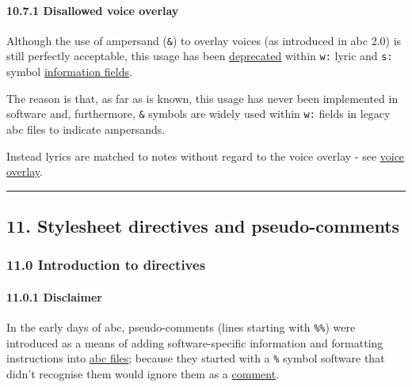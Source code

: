 \documentclass[oneside]{book}
\let\oldparagraph\paragraph
\renewcommand{\paragraph}[1]{\oldparagraph{#1}\mbox{}}
\begin{document}
\hypertarget{disallowed_voice_overlay}{\paragraph{10.7.1 Disallowed
voice overlay}\label{disallowed_voice_overlay}}

Although the use of ampersand (\texttt{\&}) to overlay voices (as
introduced in abc 2.0) is still perfectly acceptable, this usage has
been \protect\hyperlink{outdated_syntax}{deprecated} within \texttt{w:}
lyric and \texttt{s:} symbol
\protect\hyperlink{information_field_definition}{information fields}.

The reason is that, as far as is known, this usage has never been
implemented in software and, furthermore, \texttt{\&} symbols are widely
used within \texttt{w:} fields in legacy abc files to indicate
ampersands.

Instead lyrics are matched to notes without regard to the voice overlay
- see \protect\hyperlink{voice_overlay}{voice overlay}.

\begin{center}\rule{0.5\linewidth}{\linethickness}\end{center}

\hypertarget{stylesheet_directives_and_pseudo-comments}{\subsection{11.
Stylesheet directives and
pseudo-comments}\label{stylesheet_directives_and_pseudo-comments}}

\hypertarget{introduction_to_directives}{\subsubsection{11.0
Introduction to directives}\label{introduction_to_directives}}

\hypertarget{disclaimer}{\paragraph{11.0.1
Disclaimer}\label{disclaimer}}

In the early days of abc, pseudo-comments (lines starting with
\texttt{\%\%}) were introduced as a means of adding software-specific
information and formatting instructions into
\protect\hyperlink{abc_file_definition}{abc files}; because they started
with a \texttt{\%} symbol software that didn't recognise them would
ignore them as a \protect\hyperlink{comment_definition}{comment}.
\end{document}
